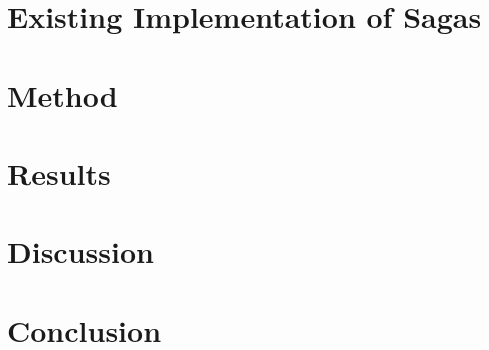 \documentclass[11pt,onecolumn]{assets/IEEEtran}
\begin{document}
\section{Existing Implementation of Sagas}


\section{Method}


\section{Results}


\section{Discussion}


\section{Conclusion}





\FloatBarrier{}





\appendix


\end{document}
